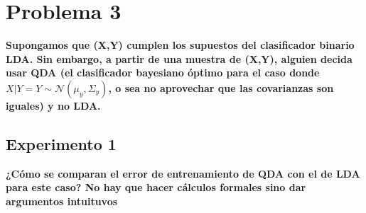 \section*{Problema 3}

\textbf{Supongamos que (X,Y) cumplen los supuestos del clasificador binario LDA. Sin embargo, a partir de una muestra de (X,Y), alguien decida usar QDA (el clasificador bayesiano óptimo para el caso donde $X|Y = Y \sim \mathcal{N}(\mu_y,\Sigma_y)$, o sea no aprovechar que las covarianzas son iguales) y no LDA.}

\subsection*{Experimento 1}

\textbf{¿Cómo se comparan el error de entrenamiento de QDA con el de LDA para este caso? No hay que hacer cálculos formales sino dar argumentos intuituvos}
